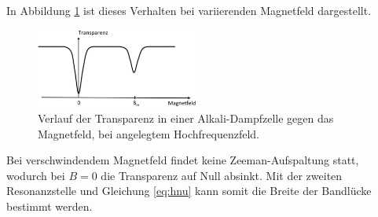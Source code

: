 In Abbildung \ref{fig:Resonanz} ist dieses Verhalten bei variierenden Magnetfeld dargestellt.
\begin{figure}
	\centering
	\includegraphics[width=0.475\textwidth]{img/Resonanz.png}
	\caption{Verlauf der Transparenz in einer Alkali-Dampfzelle gegen das Magnetfeld, bei angelegtem Hochfrequenzfeld. \cite{skript}}
	\label{fig:Resonanz}
\end{figure}
Bei verschwindendem Magnetfeld findet keine Zeeman-Aufspaltung statt, wodurch bei $B=0$ die Transparenz auf Null absinkt.
Mit der zweiten Resonanzstelle und Gleichung \ref{eq:hnu} kann somit die Breite der Bandlücke bestimmt werden.
